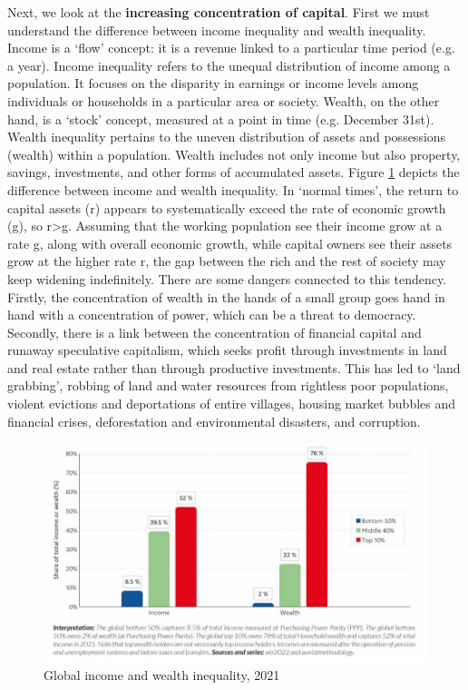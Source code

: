 \documentclass[../summary.tex]{subfiles}
\begin{document}
	 Next, we look at the \textbf{increasing concentration of capital}. First we must understand the difference between income inequality and wealth inequality. Income is a ‘flow’ concept: it is a revenue linked to a particular time period (e.g. a year). Income inequality refers to the unequal distribution of income among a population. It focuses on the disparity in earnings or income levels among individuals or households in a particular area or society. Wealth, on the other hand, is a ‘stock’ concept, measured at a point in time (e.g. December 31st). Wealth inequality pertains to the uneven distribution of assets and possessions (wealth) within a population. Wealth includes not only income but also property, savings, investments, and other forms of accumulated assets. Figure \ref{fig:income-versus-wealth} depicts the difference between income and wealth inequality. In ‘normal times’, the return to capital assets (r) appears to systematically exceed the rate of economic growth (g), so r>g. Assuming that the working population see their income grow at a rate g, along with overall economic growth, while capital owners see their assets grow at the higher rate r, the gap between the rich and the rest of society may keep widening indefinitely. There are some dangers connected to this tendency. Firstly, the concentration of wealth in the hands of a small group goes hand in hand with a concentration of power, which can be a threat to democracy. Secondly, there is a link between the concentration of financial capital and runaway speculative capitalism, which seeks profit through investments in land and real estate rather than through productive investments. This has led to `land grabbing', robbing of land and water resources from rightless poor populations, violent evictions and deportations of entire villages, housing market bubbles and financial crises, deforestation and environmental disasters, and corruption.
	 \\
	 \begin{figure}[htbp]
	 	\centering
	 	\includegraphics[width=1\linewidth]{images/11-income-versus-wealth.png}
	 	\caption{Global income and wealth inequality, 2021}
	 	\label{fig:income-versus-wealth}
	 \end{figure}
	
\end{document}
